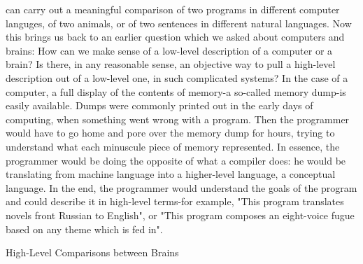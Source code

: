 can carry out a meaningful comparison of two programs in different computer languges,
of two animals, or of two sentences in different natural languages.
        Now this brings us back to an earlier question which we asked about computers
and brains: How can we make sense of a low-level description of a computer or a brain?
Is there, in any reasonable sense, an objective way to pull a high-level description out of a
low-level one, in such complicated systems? In the case of a computer, a full display of
the contents of memory-a so-called memory dump-is easily available. Dumps were
commonly printed out in the early days of computing, when something went wrong with
a program. Then the programmer would have to go home and pore over the memory
dump for hours, trying to understand what each minuscule piece of memory represented.
In essence, the programmer would be doing the opposite of what a compiler does: he
would be translating from machine language into a higher-level language, a conceptual
language. In the end, the programmer would understand the goals of the program and
could describe it in high-level terms-for example, "This program translates novels front
Russian to English", or "This program composes an eight-voice fugue based on any
theme which is fed in".





                       High-Level Comparisons between Brains

